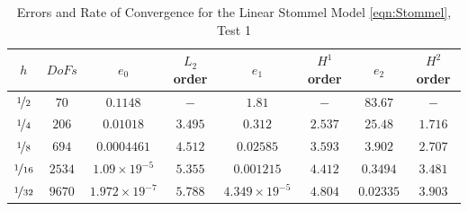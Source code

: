 \begin{table}%
\begin{center}
\begin{tabular}{|c|c|c|c|c|c|c|c|}%
  \hline
  $h$ & $DoFs$ & $e_0$ & $L_2$ order & $e_1$ & $H^1$ order & $e_2$ & $H^2$ order \\[0.2em] %
  \hline
  $\nicefrac{1}{2}$ & $70$ & $0.1148$ & $-$ & $1.81$ & $-$ & $83.67$ & $-$ \\[0.2em] %
  $\nicefrac{1}{4}$ & $206$ & $0.01018$ & $3.495$ & $0.312$ & $2.537$ & $25.48$ & $1.716$ \\[0.2em] %
  $\nicefrac{1}{8}$ & $694$ & $0.0004461$ & $4.512$ & $0.02585$ & $3.593$ & $3.902$ & $2.707$ \\[0.2em] %
  $\nicefrac{1}{16}$ & $2534$ & $1.09\times 19^{-5}$ & $5.355$ & $0.001215$ & $4.412$ & $0.3494$ & $3.481$ \\[0.2em] %
  $\nicefrac{1}{32}$ & $9670$ & $1.972\times 19^{-7}$ & $5.788$ & $4.349\times 19^{-5}$ & $4.804$ & $0.02335$ & $3.903$ \\[0.2em] %
  \hline
\end{tabular}
\end{center}
\caption{Errors and Rate of Convergence for the Linear Stommel Model \eqref{eqn:Stommel}, Test 1 \cite{Vallis06}}
\label{tab:StommelErrorsVallis}
\end{table}

